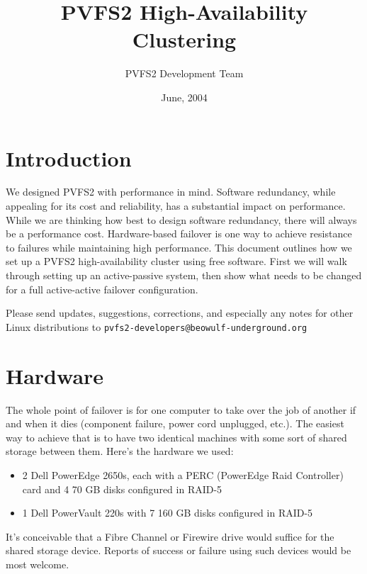 \documentclass[11pt]{article}
\title{PVFS2 High-Availability Clustering}
\author{PVFS2 Development Team}
\date{June, 2004}
\begin{document}
\maketitle


\section{Introduction}
We designed PVFS2 with performance in mind.  Software redundancy, while
appealing for its cost and reliability, has a substantial impact on
performance.  While we are thinking how best to design software
redundancy, there will always be a performance cost.  Hardware-based
failover is one way to achieve resistance to failures while maintaining
high performance.  This document outlines how we set up a PVFS2
high-availability cluster using free software.  First we will walk
through setting up an active-passive system, then show what needs to be
changed for a full active-active failover configuration.

Please send updates, suggestions, corrections, and especially any
notes for other Linux distributions to
\texttt{pvfs2-developers@beowulf-underground.org}

\section{Hardware}

The whole point of failover is for one computer to take over the job of
another if and when it dies (component failure, power cord unplugged,
etc.).   The easiest way to achieve that is to have two
identical machines with some sort of shared storage between them.
Here's the hardware we used:

\begin{itemize}
\item 2 Dell PowerEdge 2650s, 
	each with a PERC (PowerEdge Raid Controller) card
	and 4 70 GB disks configured in RAID-5
\item 1 Dell PowerVault 220s
	with 7 160 GB disks configured in RAID-5
\end{itemize}

It's conceivable that a Fibre Channel or Firewire drive would suffice for
the shared storage device.  Reports of success or failure using such
devices would be most welcome.
\end{document}
